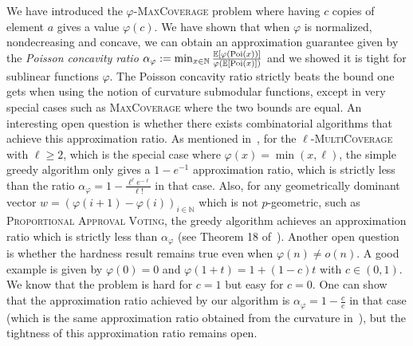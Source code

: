 We have introduced the $\varphi$-\textsc{MaxCoverage} problem where having $c$ copies of element $a$ gives a value $\varphi(c)$. We have shown that when $\varphi$ is normalized, nondecreasing and concave, we can obtain an approximation guarantee given by the \emph{Poisson concavity ratio} $\alpha_{\varphi} := \min_{x \in \mathbb{N}} \frac{\mathbb{E}[\varphi(\operatorname{\text{Poi}}(x))]}{\varphi(\mathbb{E}[\operatorname{\text{Poi}}(x)])}$ and we showed it is tight for sublinear functions $\varphi$. The Poisson concavity ratio strictly beats the bound one gets when using the notion of curvature submodular functions, except in very special cases such as \textsc{MaxCoverage} where the two bounds are equal. An interesting open question is whether there exists combinatorial algorithms that achieve this approximation ratio. As mentioned in~\cite{BFGG20}, for the $\ell$-\textsc{MultiCoverage} with $\ell \geq 2$, which is the special case where $\varphi(x) = \min(x,\ell)$, the simple greedy algorithm only gives a $1 - e^{-1}$ approximation ratio, which is strictly less than the ratio $\alpha_{\varphi} = 1-\frac{\ell^{\ell}e^{-\ell}}{\ell!}$ in that case. Also, for any geometrically dominant vector $w=(\varphi(i+1)-\varphi(i))_{i \in \mathbb{N}}$ which is not $p$-geometric, such as \textsc{Proportional Approval Voting}, the greedy algorithm achieves an approximation ratio which is strictly less than $\alpha_{\varphi}$ (see Theorem 18 of~\cite{DMMS20}). Another open question is whether the hardness result remains true even when $\varphi(n) \not= o(n)$. A good example is given by $\varphi(0)=0$ and $\varphi(1+t) = 1 + (1-c)t$ with $c \in (0,1)$. We know that the problem is hard for $c=1$ but easy for $c=0$. One can show that the approximation ratio achieved by our algorithm is $\alpha_{\varphi} = 1 - \frac{c}{e}$ in that case (which is the same approximation ratio obtained from the curvature in~\cite{SVW17}), but the tightness of this approximation ratio remains open.

